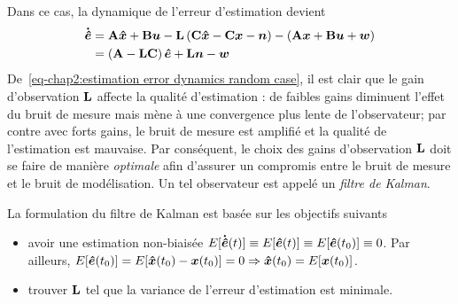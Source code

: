Dans ce cas, la dynamique de l'erreur d'estimation devient
\begin{align}\label{eq-chap2:estimation error dynamics random case}
	\begin{split}
		\bm{\dot{\hat{e}}} &=  \mathbf{A}\bm{\hat{x}}+\mathbf{B}\bm{u}-\mathbf{L}\left(\mathbf{C}\bm{\hat{x}}-\mathbf{C}\bm{x}-\bm{n}\right) - \left(\mathbf{A}\bm{x}+\mathbf{B}\bm{u}+\bm{w}\right)\\
		&=\left(\mathbf{A}-\mathbf{L}\mathbf{C}\right)\bm{\hat{e}} + \mathbf{L}\bm{n}-\bm{w}
	\end{split}
\end{align}
De~\eqref{eq-chap2:estimation error dynamics random case}, il est clair que le gain d'observation $\mathbf{L}$ affecte la qualité d'estimation : de faibles gains diminuent l'effet du bruit de mesure mais mène à une convergence  plus lente de l'observateur; par contre avec forts gains, le bruit de mesure est amplifié et la qualité de l'estimation est mauvaise. 
Par conséquent, le choix des gains d'observation $\mathbf{L}$ doit se faire de manière \emph{optimale} afin d'assurer un compromis entre le bruit de mesure et le bruit de modélisation. Un tel observateur est appelé  un \emph{filtre de Kalman}. 

La formulation du filtre de Kalman est basée sur les objectifs suivants 
 \begin{itemize}
 	\item avoir une estimation non-biaisée $E[\bm{\dot{\hat{e}}}(t)]\equiv E[\bm{\hat{e}}(t)] \equiv E[\bm{\hat{e}}(t_0)]\equiv0$. Par ailleurs,  $E[\bm{\hat{e}}(t_0)]=E[\bm{\hat{x}}(t_0) - \bm{x}(t_0)]=0 \Rightarrow\bm{\hat{x}}(t_0)=E[\bm{x}(t_0)]$.
 	\item trouver $\mathbf{L}$ tel que la variance de l'erreur d'estimation est minimale.
 \end{itemize}
